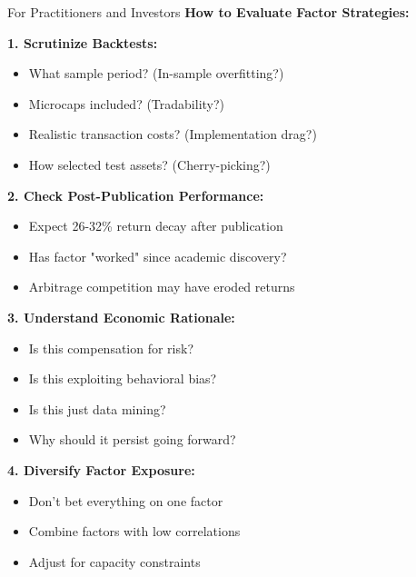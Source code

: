\documentclass{beamer}
\begin{document}
\begin{frame}[allowframebreaks]{For Practitioners and Investors}
    \textbf{How to Evaluate Factor Strategies:}
    
    \textbf{1. Scrutinize Backtests:}
    \begin{itemize}
        \item What sample period? (In-sample overfitting?)
        \item Microcaps included? (Tradability?)
        \item Realistic transaction costs? (Implementation drag?)
        \item How selected test assets? (Cherry-picking?)
    \end{itemize}
    
    
    \textbf{2. Check Post-Publication Performance:}
    \begin{itemize}
        \item Expect 26-32\% return decay after publication
        \item Has factor "worked" since academic discovery?
        \item Arbitrage competition may have eroded returns
    \end{itemize}
    
    
    \textbf{3. Understand Economic Rationale:}
    \begin{itemize}
        \item Is this compensation for risk?
        \item Is this exploiting behavioral bias?
        \item Is this just data mining?
        \item Why should it persist going forward?
    \end{itemize}
    
    
    \textbf{4. Diversify Factor Exposure:}
    \begin{itemize}
        \item Don't bet everything on one factor
        \item Combine factors with low correlations
        \item Adjust for capacity constraints
    \end{itemize}
\end{frame}
\end{document}
